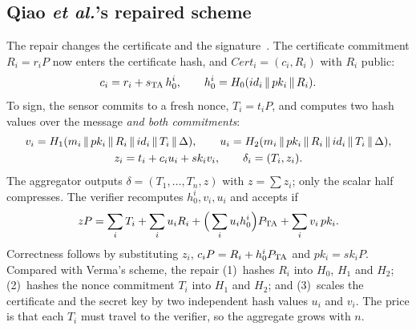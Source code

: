 \subsection{Qiao \emph{et al.}'s repaired scheme}
The repair changes the certificate and the signature~\cite{qiao2023}. The certificate commitment
$R_i=r_iP$ now enters the certificate hash, and $\mathit{Cert}_i=(c_i,R_i)$ with $R_i$ public:
\begin{equation}
c_i=r_i+s_{\mathrm{TA}}\,h_0^i,\qquad h_0^i=H_0(id_i\,\|\, pk_i\,\|\, R_i).
\end{equation}
To sign, the sensor commits to a fresh nonce, $T_i=t_iP$, and computes two hash values over the message
\emph{and both commitments}:
\begin{gather}
v_i=H_1(m_i\,\|\, pk_i\,\|\, R_i\,\|\, id_i\,\|\, T_i\,\|\,\Delta),\qquad
u_i=H_2(m_i\,\|\, pk_i\,\|\, R_i\,\|\, id_i\,\|\, T_i\,\|\,\Delta),\\
z_i=t_i+c_i u_i+sk_i v_i,\qquad \delta_i=(T_i,z_i). \label{eq:qiao-sign}
\end{gather}
The aggregator outputs $\delta=(T_1,\dots,T_n,z)$ with $z=\sum z_i$; only the scalar half compresses. The
verifier recomputes $h_0^i,v_i,u_i$ and accepts if
\begin{equation}\label{eq:qiao-verify}
zP=\sum_i T_i+\sum_i u_iR_i+\Big(\sum_i u_ih_0^i\Big)P_{\mathrm{TA}}+\sum_i v_i\,pk_i .
\end{equation}
Correctness follows by substituting $z_i$, $c_iP=R_i+h_0^iP_{\mathrm{TA}}$ and $pk_i=sk_iP$. Compared with
Verma's scheme, the repair (1)~hashes $R_i$ into $H_0$, $H_1$ and $H_2$; (2)~hashes the nonce commitment
$T_i$ into $H_1$ and $H_2$; and (3)~scales the certificate and the secret key by two independent hash
values $u_i$ and $v_i$. The price is that each $T_i$ must travel to the verifier, so the aggregate grows
with $n$.
